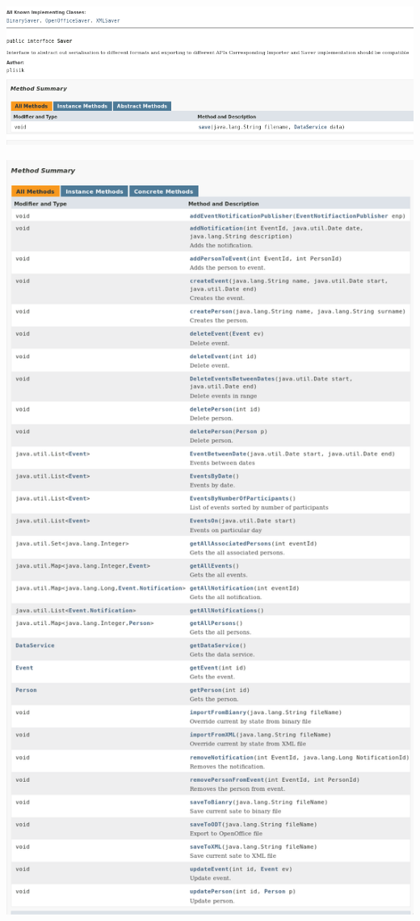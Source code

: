 \documentclass[a4paper,12pt]{article}
\begin{document}
\begin{minipage}{\textwidth}

    \includegraphics[width=\textwidth]{./screen/logicLayer/Saver.png}
    \label{Saver}

\end{minipage}

\begin{minipage}{0.8\textwidth}

    \includegraphics[width=\textwidth]{./screen/logicLayer/LogicLayerImpl.png}
    \label{LogicLayerImpl}


\end{minipage}
\end{document}
